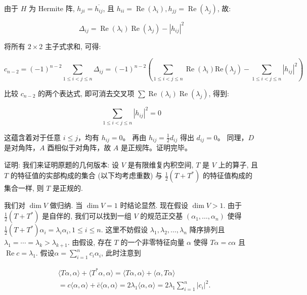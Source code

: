 \begin{enumerate}
由于 $H$ 为 Hermite 阵, \(h_{ji} = \overline{h_{ij}}\), 且
\(h_{ii} = \operatorname{Re}(\lambda_i), h_{jj} = \operatorname{Re}(\lambda_j)\),
 故:

\[\Delta_{i j} = \operatorname{Re} (\lambda_{i}) \operatorname{Re} (\lambda_{j}) - |h_{i j}|^{2}\]

将所有 \(2 \times 2\) 主子式求和, 可得:

\[c_{n-2} = (-1)^{n-2} \sum_{1 \leqslant i < j \leqslant n} \Delta_{i j} 
= (-1)^{n-2} \left(\sum_{1 \leqslant i < j \leqslant n} \operatorname{Re} (\lambda_ {i}) \mathrm{Re} (\lambda_ {j}) - \sum_ {1 \leqslant i < j \leqslant n} | h_{i j} | ^ {2}\right)\]

比较 \(c_{n-2}\) 的两个表达式, 即可消去交叉项
\(\sum\operatorname{Re}(\lambda_{i})\operatorname{Re}(\lambda_{j})\), 得到:

\[\sum_{1 \leqslant i < j \leqslant n} |h_{i j}|^{2} = 0\]

这蕴含着对于任意 $i \leqslant j$，均有 \(h_{ij} = 0\)。
再由 \(h_{ij} = \frac{1}{2}d_{ij}\) 得出 \(d_{ij} = 0\)。
同理，$D$ 是对角阵，$A$ 酉相似于对角阵，故 $A$ 是正规阵。证明完毕。

证明: 我们来证明原题的几何版本: 设 $V$ 是有限维复内积空间, 
$T$ 是 $V$ 上的算子, 且 $T$ 的特征值的实部构成的集合 (以下均考虑重数) 与
\(\frac{1}{2}(T + T^{*})\) 的特征值构成的集合一样, 则 $T$ 是正规的.

我们对 \(\dim V\) 做归纳. 当 \(\dim V = 1\) 时结论显然. 
现在假设 \(\dim V > 1\). 由于 \(\frac{1}{2}(T + T^{*})\) 是自伴的,
我们可以找到一组 $V$ 的规范正交基 \((\alpha_{1}, \ldots, \alpha_{n})\) 使得
\(\frac{1}{2}(T + T^{*})\alpha_{i} = \lambda_{i}\alpha_{i}, 1 \leqslant i \leqslant n\).
 这里不妨假设 \(\lambda_{1}, \lambda_{2}, \ldots, \lambda_{n}\)
降序排列且 \(\lambda_{1} = \cdots = \lambda_{k} > \lambda_{k+1}\).
由假设, 存在 $T$ 的一个非零特征向量 \(\alpha\) 
使得 \(T\alpha = c\alpha\) 且 \(\operatorname{Re}c = \lambda_1\). 
假设\(\displaystyle\alpha = \sum_{i=1}^{n} c_i \alpha_i\), 此时注意到

\begin{align*}
    & \langle T \alpha, \alpha \rangle + \langle T ^ {*} \alpha, \alpha \rangle 
    = \langle T \alpha, \alpha \rangle + \langle \alpha, T \alpha \rangle \\ 
    & = c \langle \alpha, \alpha \rangle + \bar{c} \langle \alpha, \alpha \rangle 
    = 2 \lambda_{1} \langle \alpha, \alpha \rangle 
    = 2 \lambda_{1} \sum_{i=1}^{n} |c_{i}|^{2}.
\end{align*}


\end{enumerate}
